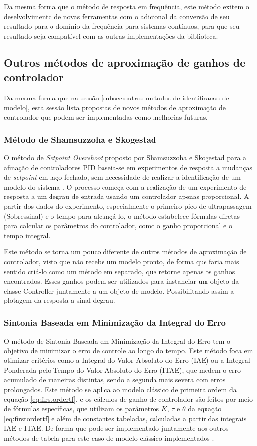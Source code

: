 Da mesma forma que o método de resposta em frequência, este método exitem o deselvolvimento de novas ferramentas
com o adicional da conversão de seu resultado para o domínio da frequência para sistemas contínuos, para que seu
resultado seja compatível com as outras implementações da biblioteca.


\subsection{Outros métodos de aproximação de ganhos de controlador}
Da mesma forma que na sessão \ref{subsec:outros-metodos-de-identificacao-de-modelo}, esta sessão lista propostas
de novos métodos de aproximação de controlador que podem ser implementadas como melhorias futuras.

\subsubsection{Método de Shamsuzzoha e Skogestad}
O método de \textit{Setpoint Overshoot} proposto por Shamsuzzoha e Skogestad para a afinação de controladores PID baseia-se em
experimentos de resposta a mudanças de \textit{setpoint} em laço fechado, sem necessidade de realizar a identificação de um
modelo do sistema \cite{skoge}.
O processo começa com a realização de um experimento de resposta a um degrau de entrada usando um controlador apenas
proporcional.
A partir dos dados do experimento, especialmente o primeiro pico de ultrapassagem (Sobressinal) e o tempo para alcançá-lo,
o método estabelece fórmulas diretas para calcular os parâmetros do controlador, como o ganho proporcional e o tempo
integral.

Este método se torna um pouco diferente de outros métodos de aproximação de controlador, visto que não recebe um modelo
pronto, de forma que faria mais sentido criá-lo como um método em separado, que retorne apenas os ganhos encontrados.
Esses ganhos podem ser utilizados para instanciar um objeto da classe Controller juntamente a um objeto de modelo.
Possibilitando assim a plotagem da resposta a sinal degrau.

\subsubsection{Sintonia Baseada em Minimização da Integral do Erro}
O método de Sintonia Baseada em Minimização da Integral do Erro tem o objetivo de minimizar o erro de controle ao
longo do tempo.
Este método foca em otimizar critérios como a Integral do Valor Absoluto do Erro (IAE) ou a Integral Ponderada pelo
Tempo do Valor Absoluto do Erro (ITAE), que medem o erro acumulado de maneiras distintas, sendo a segunda mais severa
com erros prolongados.
Este método se aplica ao modelo clássico de primeira ordem da equação \eqref{eq:firstordertf}, e os cálculos de ganho
de controlador são feitos por meio de fórmulas específicas, que utilizam os parâmetros $K$, $\tau$ e $\theta$ da equação
\eqref{eq:firstordertf} e além de constantes tabeladas, calculadas a partir das integrais IAE e ITAE.
De forma que pode ser implementado juntamente aos outros métodos de tabela para este caso de modelo clássico
implementados \cite{apostpidsint}.

